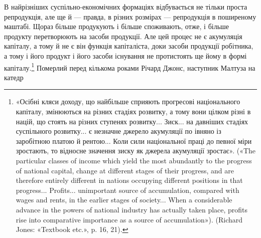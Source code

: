 В найрізніших суспільно-економічних формаціях відбувається
не тільки проста репродукція, але ще й — правда, в різних
розмірах — репродукція в поширеному маштабі. Щораз більше
продукують і більше споживають, отже, і більше продукту перетворюють
на засоби продукції. Але цей процес не є акумуляція
капіталу, а тому й не є він функція капіталіста, доки засоби продукції
робітника, а тому і його продукт і його засоби існування
не протистоять ще йому в формі капіталу.\footnote{
«Осібні кляси доходу, що найбільше сприяють прогресові національного
капіталу, змінюються на різних стадіях розвитку, а тому вони
цілком різні в націй, що стоять на різних ступенях розвитку... Зиск...
на давніших стадіях суспільного розвитку... є незначне джерело акумуляції
по івняно із заробітною платою й рентою... Коли сили національної
праці до певної міри зростають, то відносне значення зиску як
джерела акумуляції зростає». («The particular classes of income which
yield the most abundantly to the progress of national capital, change at
different stages of their progress, and are therefore entirely different in
nations occupying different positions in that progress... Profits... unimportant
source of accumulation, compared with wages and rents, in the
earlier stages of society... When a considerable advance in the powers of
national industry has actually taken place, profits rise into comparative
importance as a source of accumulation»). (Richard Jones: «Textbook
etc.», p. 16, 21).
} Померлий перед
кількома роками Річард Джонс, наступник Малтуза на катедр
\parbreak{}  %
